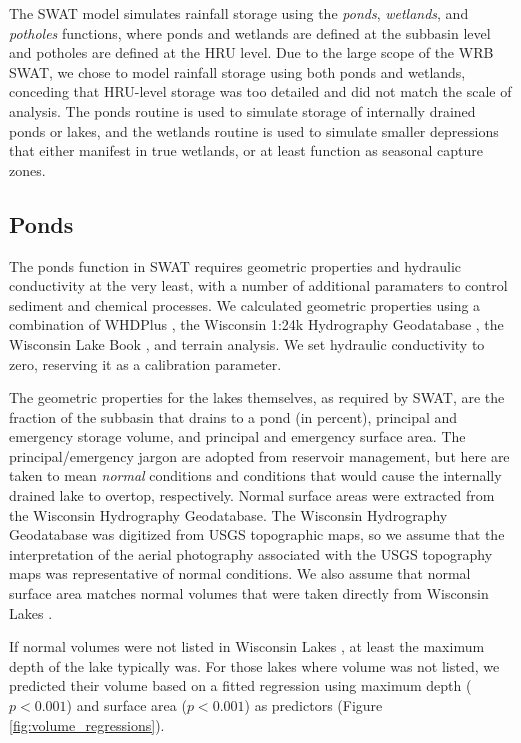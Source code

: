 The SWAT model simulates rainfall storage using the \textit{ponds}, \textit{wetlands}, and \textit{potholes} functions, where ponds and wetlands are defined at the subbasin level and potholes are defined at the HRU level. Due to the large scope of the WRB SWAT, we chose to model rainfall storage using both ponds and wetlands, conceding that HRU-level storage was too detailed and did not match the scale of analysis. The ponds routine is used to simulate storage of internally drained ponds or lakes, and the wetlands routine is used to simulate smaller depressions that either manifest in true wetlands, or at least function as seasonal capture zones.

\subsection{Ponds}\label{sec:ponds}

The ponds function in SWAT requires geometric properties and hydraulic conductivity at the very least, with a number of additional paramaters to control sediment and chemical processes. We calculated geometric properties using a combination of WHDPlus \citep{wdnr_whdplus_2013}, the Wisconsin 1:24k Hydrography Geodatabase , the Wisconsin Lake Book , and terrain analysis. We set hydraulic conductivity to zero, reserving it as a calibration parameter.

The geometric properties for the lakes themselves, as required by SWAT, are the fraction of the subbasin that drains to a pond (in percent), principal and emergency storage volume, and principal and emergency surface area. The principal/emergency jargon are adopted from reservoir management, but here are taken to mean \textit{normal} conditions and conditions that would cause the internally drained lake to overtop, respectively. Normal surface areas were extracted from the Wisconsin Hydrography Geodatabase. The Wisconsin Hydrography Geodatabase was digitized from USGS topographic maps, so we assume that the interpretation of the aerial photography associated with the USGS topography maps was representative of normal conditions.  We also assume that normal surface area matches normal volumes that were taken directly from Wisconsin Lakes .

If normal volumes were not listed in Wisconsin Lakes , at least the maximum depth of the lake typically was. For those lakes where volume was not listed, we predicted their volume based on a fitted regression using maximum depth ($p < 0.001$) and surface area ($p < 0.001$) as predictors (Figure \ref{fig:volume_regressions}).

